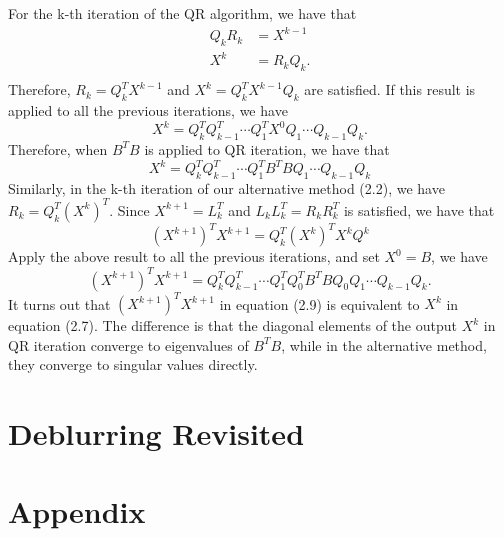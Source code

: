 For the k-th iteration of the QR algorithm, we have that
\begin{equation}\tag{2.5}
    \begin{aligned}
    Q_kR_k &= X^{k - 1} \\
    X^k &= R_kQ_k. \\
    \end{aligned}
\end{equation}
Therefore, $R_k = Q_k^T X^{k - 1}$ and $X^k = Q_k^T X^{k - 1}Q_k$ are satisfied. If this result is applied to all the previous iterations, we have
\begin{equation}\tag{2.6}
    X^k = Q_k^T Q_{k-1}^T \cdots Q_1^T X^0 Q_1 \cdots Q_{k-1} Q_k.
\end{equation}
Therefore, when $B^TB$ is applied to QR iteration, we have that 
\begin{equation}\tag{2.7}
    X^k = Q_k^T Q_{k-1}^T \cdots Q_1^T B^TB Q_1 \cdots Q_{k-1} Q_k
\end{equation}
Similarly, in the k-th iteration of our alternative method (2.2), we have $R_k = Q_k^T(X^k)^T$. Since $X^{k+1} = L_k^T$ and $L_kL_k^T = R_kR_k^T$ is satisfied, we have that 
\begin{equation}\tag{2.8}
    (X^{k+1})^TX^{k+1} = Q_k^T(X^k)^TX^kQ^k
\end{equation}
Apply the above result to all the previous iterations, and set $X^0 = B$, we have 
\begin{equation}\tag{2.9}
    (X^{k+1})^TX^{k+1} = Q_k^T Q_{k-1}^T \cdots Q_1^T Q_0^T B^TB Q_0 Q_1 \cdots Q_{k-1} Q_k.
\end{equation}
It turns out that $(X^{k+1})^TX^{k+1}$ in equation (2.9) is equivalent to $X^k$ in equation (2.7). The difference is that the diagonal elements of the output $X^k$ in QR iteration converge to eigenvalues of $B^TB$, while in the alternative method, they converge to singular values directly. 
\section{Deblurring Revisited}


\section{Appendix}
